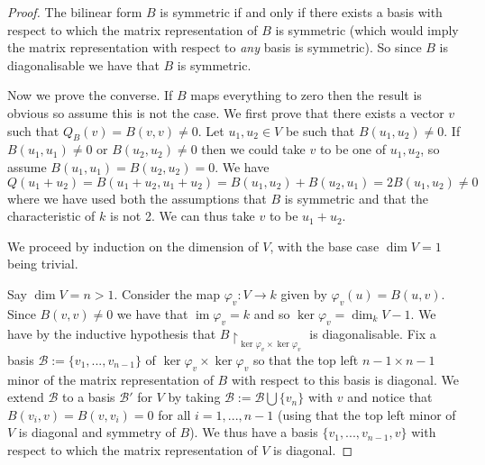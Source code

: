 \documentclass[12pt]{article}
\theoremstyle{plain}
\theoremstyle{definition}
\newcommand{\scr}[1]{\mathscr{#1}}
\newcommand{\lto}{\longrightarrow}
\begin{document}
	\begin{proof}
		The bilinear form $B$ is symmetric if and only if there exists a basis with respect to which the matrix representation of $B$ is symmetric (which would imply the matrix representation with respect to \emph{any} basis is symmetric). So since $B$ is diagonalisable we have that $B$ is symmetric.
		
		Now we prove the converse. If $B$ maps everything to zero then the result is obvious so assume this is not the case. We first prove that there exists a vector $v$ such that $Q_B(v) = B(v,v) \neq 0$. Let $u_1,u_2 \in V$ be such that $B(u_1,u_2) \neq 0$. If $B(u_1,u_1) \neq 0$ or $B(u_2,u_2) \neq 0$ then we could take $v$ to be one of $u_1,u_2$, so assume $B(u_1,u_1) = B(u_2,u_2) = 0$. We have
		\begin{equation}
			Q(u_1 + u_2) = B(u_1 + u_2, u_1 + u_2) = B(u_1,u_2) + B(u_2,u_1) = 2B(u_1,u_2) \neq 0
		\end{equation}
		where we have used both the assumptions that $B$ is symmetric and that the characteristic of $k$ is not 2. We can thus take $v$ to be $u_1 + u_2$.
		
		We proceed by induction on the dimension of $V$, with the base case $\operatorname{dim}V = 1$ being trivial.
		
		Say $\operatorname{dim}V = n > 1$. Consider the map $\varphi_v: V \lto k$ given by $\varphi_v(u) = B(u,v)$. Since $B(v,v) \neq 0$ we have that $\operatorname{im}\varphi_v = k$ and so $\operatorname{ker}\varphi_v = \operatorname{dim}_kV - 1$. We have by the inductive hypothesis that $B\restriction_{\operatorname{ker}\varphi_v \times \operatorname{ker}\varphi_v}$ is diagonalisable. Fix a basis $\scr{B} := \lbrace v_1,...,v_{n-1}\rbrace$ of $\operatorname{ker}\varphi_v \times \operatorname{ker}\varphi_v$ so that the top left $n-1 \times n-1$ minor of the matrix representation of $B$ with respect to this basis is diagonal. We extend $\scr{B}$ to a basis $\scr{B}'$ for $V$ by taking $\scr{B} := \scr{B} \bigcup \lbrace v_n\rbrace$ with $v$ and notice that $B(v_i,v) = B(v,v_i) = 0$ for all $i = 1,...,n-1$ (using that the top left minor of $V$ is diagonal and symmetry of $B$). We thus have a basis $\lbrace v_1,...,v_{n-1},v\rbrace$ with respect to which the matrix representation of $V$ is diagonal.
	\end{proof}
\end{document}

